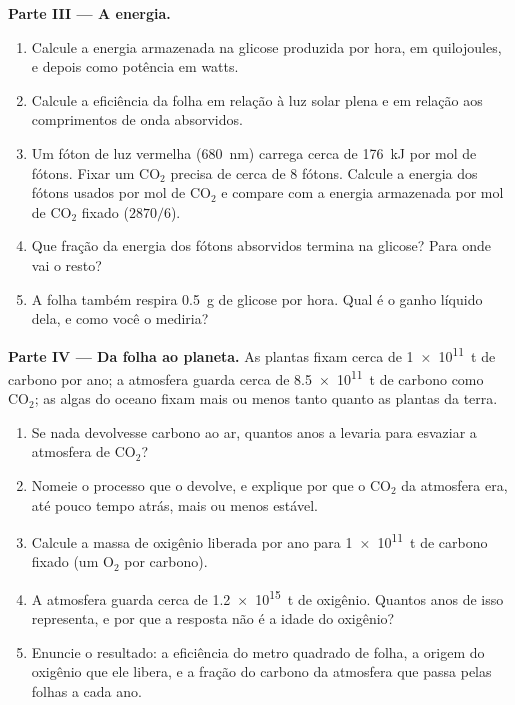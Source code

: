 \begin{problem}
\medskip
\noindent\textbf{Parte III --- A energia.}
\begin{enumerate}[resume]
  \item Calcule a energia armazenada na glicose produzida por hora, em
        quilojoules, e depois como potência em watts.
  \item Calcule a eficiência da folha em relação à luz solar plena e em
        relação aos comprimentos de onda absorvidos.
  \item Um fóton de luz vermelha (\qty{680}{nm}) carrega cerca de
        \qty{176}{kJ} por mol de fótons. Fixar um $\mathrm{CO_2}$
        precisa de cerca de 8 fótons. Calcule a energia dos fótons
        usados por mol de $\mathrm{CO_2}$ e compare com a energia
        armazenada por mol de $\mathrm{CO_2}$ fixado ($2870/6$).
  \item Que fração da energia dos fótons absorvidos termina na glicose?
        Para onde vai o resto?
  \item A folha também respira \qty{0.5}{g} de glicose por hora. Qual é
        o ganho líquido dela, e como você o mediria?
\end{enumerate}

\medskip
\noindent\textbf{Parte IV --- Da folha ao planeta.}
As plantas fixam cerca de \qty{1e11}{t} de carbono por ano; a atmosfera
guarda cerca de \qty{8.5e11}{t} de carbono como $\mathrm{CO_2}$; as
algas do oceano fixam mais ou menos tanto quanto as plantas da terra.
\begin{enumerate}[resume]
  \item Se nada devolvesse carbono ao ar, quantos anos a 
        levaria para esvaziar a atmosfera de $\mathrm{CO_2}$?
  \item Nomeie o processo que o devolve, e explique por que o
        $\mathrm{CO_2}$ da atmosfera era, até pouco tempo atrás, mais
        ou menos estável.
  \item Calcule a massa de oxigênio liberada por ano para \qty{1e11}{t}
        de carbono fixado (um $\mathrm{O_2}$ por carbono).
  \item A atmosfera guarda cerca de \qty{1.2e15}{t} de oxigênio.
        Quantos anos de  isso representa, e por que a
        resposta não é a idade do oxigênio?
  \item Enuncie o resultado: a eficiência do metro quadrado de folha, a
        origem do oxigênio que ele libera, e a fração do carbono da
        atmosfera que passa pelas folhas a cada ano.
\end{enumerate}
\end{problem}
